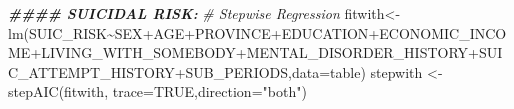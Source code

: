 \documentclass[
]{book}
\newenvironment{Shaded}{\begin{snugshade}}{\end{snugshade}}
\newcommand{\AttributeTok}[1]{\textcolor[rgb]{0.77,0.63,0.00}{#1}}
\newcommand{\CommentTok}[1]{\textcolor[rgb]{0.56,0.35,0.01}{\textit{#1}}}
\newcommand{\ConstantTok}[1]{\textcolor[rgb]{0.00,0.00,0.00}{#1}}
\newcommand{\DocumentationTok}[1]{\textcolor[rgb]{0.56,0.35,0.01}{\textbf{\textit{#1}}}}
\newcommand{\FunctionTok}[1]{\textcolor[rgb]{0.00,0.00,0.00}{#1}}
\newcommand{\NormalTok}[1]{#1}
\newcommand{\OtherTok}[1]{\textcolor[rgb]{0.56,0.35,0.01}{#1}}
\newcommand{\SpecialCharTok}[1]{\textcolor[rgb]{0.00,0.00,0.00}{#1}}
\newcommand{\StringTok}[1]{\textcolor[rgb]{0.31,0.60,0.02}{#1}}
\begin{document}
\begin{Shaded}
\begin{Highlighting}[]
\DocumentationTok{\#\#\#\# SUICIDAL RISK:}
\CommentTok{\# Stepwise Regression}
\NormalTok{fitwith}\OtherTok{\textless{}{-}}\FunctionTok{lm}\NormalTok{(SUIC\_RISK}\SpecialCharTok{\textasciitilde{}}\NormalTok{SEX}\SpecialCharTok{+}\NormalTok{AGE}\SpecialCharTok{+}\NormalTok{PROVINCE}\SpecialCharTok{+}\NormalTok{EDUCATION}\SpecialCharTok{+}\NormalTok{ECONOMIC\_INCOME}\SpecialCharTok{+}\NormalTok{LIVING\_WITH\_SOMEBODY}\SpecialCharTok{+}\NormalTok{MENTAL\_DISORDER\_HISTORY}\SpecialCharTok{+}\NormalTok{SUIC\_ATTEMPT\_HISTORY}\SpecialCharTok{+}\NormalTok{SUB\_PERIODS,}\AttributeTok{data=}\NormalTok{table)}
\NormalTok{stepwith }\OtherTok{\textless{}{-}} \FunctionTok{stepAIC}\NormalTok{(fitwith, }\AttributeTok{trace=}\ConstantTok{TRUE}\NormalTok{,}\AttributeTok{direction=}\StringTok{"both"}\NormalTok{)}
\end{Highlighting}
\end{Shaded}
\end{document}
